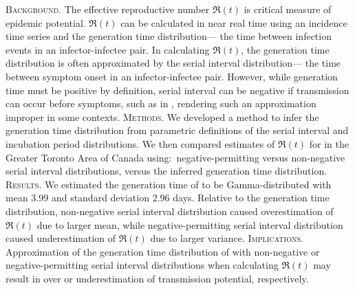 \textsc{Background}.
The effective reproductive number $\Re(t)$
is critical measure of epidemic potential.
$\Re(t)$ can be calculated in near real time
using an incidence time series and the generation time distribution---%
the time between infection events in an infector-infectee pair.
In calculating $\Re(t)$, the generation time distribution
is often approximated by the serial interval distribution---%
the time between symptom onset in an infector-infectee pair.
However, while generation time must be positive by definition,
serial interval can be negative if transmission can occur before symptoms,
such as in \covid, rendering such an approximation improper in some contexts. %
\textsc{Methods}.
We developed a method to infer the generation time distribution
from parametric definitions of
the serial interval and incubation period distributions.
We then compared estimates of $\Re(t)$ for \covid in
the Greater Toronto Area of Canada using:\
negative-permitting versus non-negative serial interval distributions,
versus the inferred generation time distribution.
\textsc{Results}.
We estimated the generation time of \covid to be
Gamma-distributed with mean $3.99$ and standard deviation $2.96$ days.
Relative to the generation time distribution,
non-negative serial interval distribution caused overestimation of $\Re(t)$
due to larger mean, while
negative-permitting serial interval distribution caused underestimation of $\Re(t)$
due to larger variance.
\textsc{Implications}.
Approximation of the generation time distribution of \covid
with non-negative or negative-permitting serial interval distributions
when calculating $\Re(t)$ may result in over or underestimation of
transmission potential, respectively.